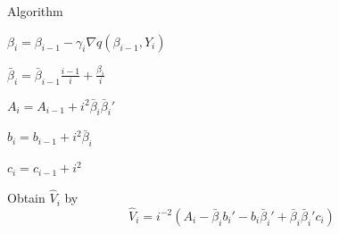 \documentclass[beamer, t]{beamer}
\begin{document}
\begin{frame}{Algorithm}

\begin{algorithm}[H]
\footnotesize


  {
    $\beta_{i}=\beta_{i-1}-\gamma_{i}\nabla q\left(\beta_{i-1},Y_{i}\right)$

    $\bar{\beta}_{i}=\bar{\beta}_{i-1}\frac{i-1}{i}+\frac{\beta_{i}}{i}$

    $A_{i} = A_{i-1} + i^{2}\bar{\beta}_{i}\bar{\beta}_{i}'$

    $b_{i} = b_{i-1} + i^{2}\bar{\beta}_{i}$
    
    $c_i =c_{i-1} + i^2$

    Obtain $\widehat{V}_{i}$ by
      \[
      \widehat{V}_{i}
      = i^{-2} \left( A_i - \bar{\beta}_{i} b_{i}' - b_{i}\bar{\beta}_{i}' +\bar{\beta}_{i}\bar{\beta}_{i}'c_i \right)
      \]

 }
\end{algorithm}

\end{frame}
\end{document}
